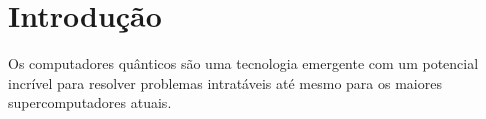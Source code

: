 \newpage
\section{Introdução}

Os computadores quânticos são uma tecnologia emergente com um potencial incrível para resolver problemas intratáveis até mesmo para os maiores supercomputadores atuais. 